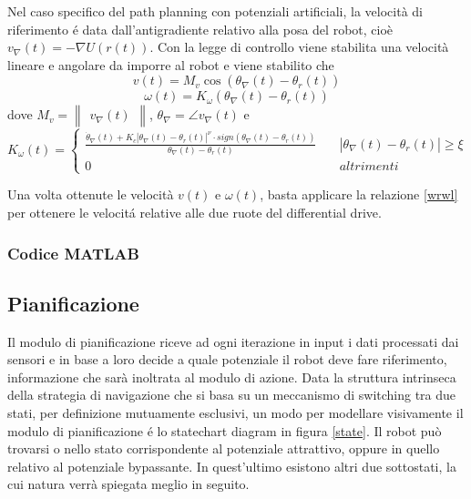 \documentclass[14pt,a4paper]{extarticle}
\begin{document}
Nel caso specifico del path planning con potenziali artificiali, la velocità di riferimento é data dall'antigradiente relativo alla posa del robot, cioè \(v_\nabla(t) = -\nabla U(r(t))\). Con la legge di controllo viene stabilita una velocità lineare e angolare da imporre al robot e viene stabilito che
\begin{equation}
v(t) = M_v \cos(\theta_{\nabla}(t) - \theta_r(t))
\end{equation} 
\begin{equation}
\omega(t) = K_{\omega}(\theta_{\nabla}(t) - \theta_r(t))
\end{equation} dove \(M_v=\begin{Vmatrix}v_{\nabla}(t)\end{Vmatrix}\), \(\theta_{\nabla}=\angle v_{\nabla}(t)\) e 
\[K_{\omega}(t)= \begin{cases}
\frac{\dot{\theta}_{\nabla}(t) + K_c|\theta_{\nabla}(t)-\theta_r(t)|^{\nu} \cdot sign(\theta_{\nabla}(t) - \theta_r(t))}{\theta_{\nabla}(t) - \theta_r(t)} \quad &|\theta_{\nabla}(t)-\theta_r(t)| \geq \xi \\
0 \quad &altrimenti
\end{cases}\]

Una volta ottenute le velocità \(v(t)\) e \(\omega(t)\), basta applicare la relazione \ref{wrwl} per ottenere le velocitá relative alle due ruote del differential drive.

\subsubsection{Codice MATLAB}


\subsection{Pianificazione}
Il modulo di pianificazione riceve ad ogni iterazione in input i dati processati dai sensori e in base a loro decide a quale potenziale il robot deve fare riferimento, informazione che sarà inoltrata al modulo di azione. Data la struttura intrinseca della strategia di navigazione che si basa su un meccanismo di switching tra due stati, per definizione mutuamente esclusivi, un modo per modellare visivamente il modulo di pianificazione é lo statechart diagram in figura \ref{state}. Il robot può trovarsi o nello stato corrispondente al potenziale attrattivo, oppure in quello relativo al potenziale bypassante. In quest'ultimo esistono altri due sottostati, la cui natura verrà spiegata meglio in seguito.\\
\end{document}
